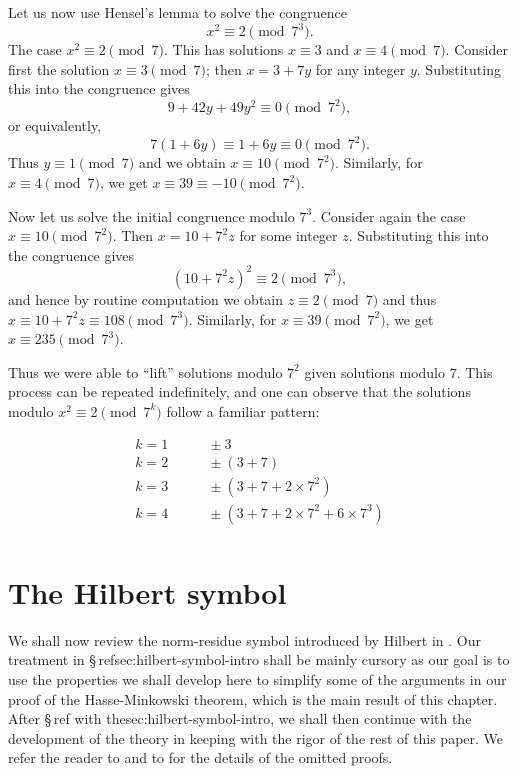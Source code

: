 \smallskip

Let us now use Hensel's lemma to solve the congruence
\[
    x^2 \equiv 2 \pmod{7^3}.  
\]
The case \(x^2 \equiv 2 \pmod{7}\). This has solutions \(x \equiv 3\) and \(x \equiv 4 \pmod{7}\). Consider first the solution \(x \equiv 3 \pmod{7}\); then \(x = 3 + 7y\) for any integer \(y\). Substituting this into the congruence gives
\[
    9 + 42y + 49y^2 \equiv 0 \pmod{7^2},
\]
or equivalently,
\[
    7(1 + 6y) \equiv 1 + 6y \equiv 0 \pmod{7^2}.
\]
Thus \(y \equiv 1 \pmod{7}\) and we obtain \(x \equiv 10 \pmod{7^2}\). Similarly, for \(x \equiv 4 \pmod{7}\), we get \(x \equiv 39 \equiv -10 \pmod{7^2}\).

Now let us solve the initial congruence modulo \(7^3\). Consider again the case \(x \equiv 10 \pmod{7^2}\). Then \(x = 10 + 7^2z\) for some integer \(z\). Substituting this into the congruence gives
\[
    (10+7^2z)^2 \equiv 2 \pmod{7^3},
\]
and hence by routine computation we obtain \(z \equiv 2 \pmod{7}\) and thus \(x \equiv 10 + 7^2z \equiv 108 \pmod{7^3}\). Similarly, for \(x \equiv 39 \pmod{7^2}\), we get \(x \equiv 235 \pmod{7^3}\).

Thus we were able to ``lift'' solutions modulo \(7^2\) given solutions modulo \(7\). This process can be repeated indefinitely, and one can observe that the solutions modulo \(x^2 \equiv 2 \pmod{7^k}\) follow a familiar pattern:

\begin{align*}
    k = 1 & \qquad \pm 3 \\
    k = 2 & \qquad \pm (3 + 7) \\
    k = 3 & \qquad \pm (3 + 7 + 2 \times 7^2) \\
    k = 4 & \qquad \pm (3 + 7 + 2 \times 7^2 + 6 \times 7^3) \\
\end{align*}

\section{The Hilbert symbol}\label{sec:hilbert-symbol}

We shall now review the norm-residue symbol introduced by Hilbert in \cite[pp.~286--287]{hilbert1932theorie}. Our treatment in \S\,ref{sec:hilbert-symbol-intro} shall be mainly cursory as our goal is to use the properties we shall develop here to simplify some of the arguments in our proof of the Hasse-Minkowski theorem, which is the main result of this chapter. After \S\,ref with the{sec:hilbert-symbol-intro}, we shall then continue with the development of the theory in keeping with the rigor of the rest of this paper.  We refer the reader to \cite{serre2012course} and to \cite{sutherland2013introduction} for the details of the omitted proofs.

